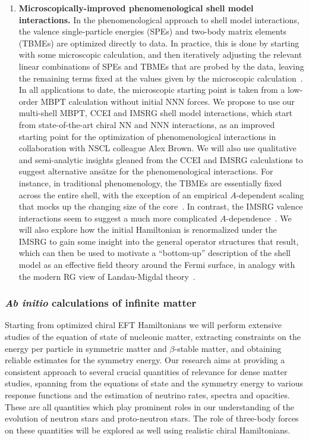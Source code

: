 \begin{enumerate}
\item{\bf Microscopically-improved phenomenological shell model
    interactions.}  In the phenomenological approach to shell model
  interactions, the valence single-particle energies (SPEs) and
  two-body matrix elements (TBMEs) are optimized directly to data. In
  practice, this is done by starting with some microscopic
  calculation, and then iteratively adjusting the relevant linear
  combinations of SPEs and TBMEs that are probed by the data, leaving
  the remaining terms fixed at the values given by the microscopic
  calculation~\cite{Brown:1988vm,Brown:2001rg,Caurier:2005qf}. In all
  applications to date, the microscopic starting point is taken from a
  low-order MBPT calculation without initial NNN forces. We propose to
  use our multi-shell MBPT, CCEI and IMSRG shell model interactions, which start from
  state-of-the-art chiral NN and NNN interactions, as an improved starting point for the
  optimization of phenomenological interactions in collaboration with NSCL colleague Alex Brown. We will also use
  qualitative and semi-analytic insights gleaned from the CCEI and
  IMSRG calculations to suggest alternative ans\"atze for the
  phenomenological interactions. For instance, in traditional
  phenomenology, the TBMEs are essentially fixed across the entire
  shell, with the exception of an empirical $A$-dependent scaling that
  mocks up the changing size of the
  core~\cite{Brown:1988vm,Brown:2001rg}. In contrast, the IMSRG
  valence interactions seem to suggest a much more complicated
  $A$-dependence~\cite{Stroberg:2015ymf,Stroberg:2016ung}.  We will
  also explore how the initial Hamiltonian is renormalized under the
  IMSRG to gain some insight into the general operator structures that
  result, which can then be used to motivate a ``bottom-up''
  description of the shell model as an effective field theory around
  the Fermi surface, in analogy with the modern RG view of
  Landau-Migdal theory~\cite{ShankarRG,MigdalBook}.
    
\end{enumerate}



\subsubsection{{\em Ab initio} calculations of infinite matter}\label{subsec:infinitematter}

Starting from optimized chiral EFT Hamiltonians we will perform extensive
studies of the equation of state of nucleonic matter, extracting
constraints on the energy per particle in symmetric matter and
$\beta$-stable matter, and obtaining reliable estimates for the
symmetry energy.  Our research aims at providing a consistent approach to several crucial quantities of relevance
for dense matter studies, spanning from the equations of state and the symmetry energy 
to various response functions and the estimation of  neutrino rates, spectra and opacities. These are all
quantities which play prominent roles in  our understanding of the evolution of neutron stars and proto-neutron stars.
The role of three-body forces on these quantities will be explored as well using realistic chiral Hamiltonians.

